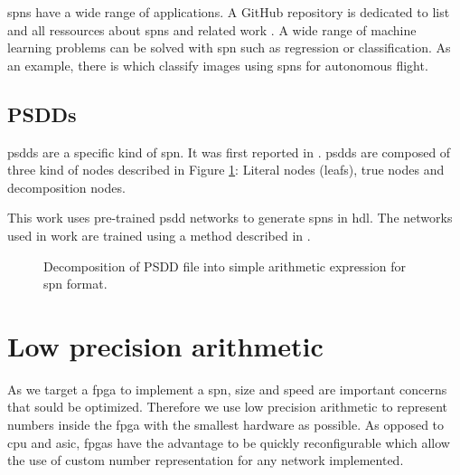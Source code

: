 \Glspl{spn} have a wide range of applications. A GitHub repository is dedicated to list and all ressources about \glspl{spn} and related work \cite{awesome_spn}. A wide range of machine learning problems can be solved with \gls{spn} such as regression or classification. As an example, there is \cite{spn_classification} which classify images using \glspl{spn} for autonomous flight.

\subsection{PSDDs}

\Glspl{psdd} are a specific kind of \gls{spn}. It was first reported in \cite{psdd_0}. \Glspl{psdd} are composed of three kind of nodes described in Figure \ref{fig:psdd2spn}: Literal nodes (leafs), true nodes and decomposition nodes.

This work uses pre-trained \gls{psdd} networks to generate \glspl{spn} in \gls{hdl}. The networks used in work are trained using a method described in \cite{psdd_1}.

\begin{figure}[!ht]
\begin{mdframed}
  \centering
   \hspace{00.5cm}
   \hspace{0.5cm}
  \caption{Decomposition of PSDD file into simple arithmetic expression for \gls{spn} format.}
  \label{fig:psdd2spn}
\end{mdframed}
\end{figure}


\section{Low precision arithmetic}

As we target a \gls{fpga} to implement a \gls{spn}, size and speed are important concerns that sould be optimized. Therefore we use low precision arithmetic to represent numbers inside the \gls{fpga} with the smallest hardware as possible. As opposed to \gls{cpu} and \gls{asic}, \Glspl{fpga} have the advantage to be quickly reconfigurable which allow the use of custom number representation for any network implemented.

